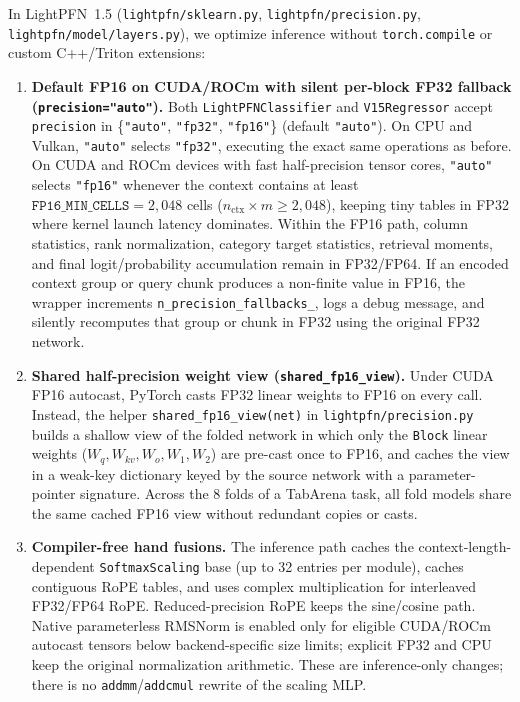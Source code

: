 \documentclass[11pt]{article}
\begin{document}
In LightPFN~1.5 (\texttt{lightpfn/sklearn.py}, \texttt{lightpfn/precision.py}, \texttt{lightpfn/model/layers.py}), we optimize inference without \texttt{torch.compile} or custom C++/Triton extensions: %
\begin{enumerate}
\item \textbf{Default FP16 on CUDA/ROCm with silent per-block FP32 fallback (\texttt{precision="auto"}).}
Both \texttt{LightPFNClassifier} and \texttt{V15Regressor} accept \texttt{precision} in \{\texttt{"auto"}, \texttt{"fp32"}, \texttt{"fp16"}\} (default \texttt{"auto"}).
On CPU and Vulkan, \texttt{"auto"} selects \texttt{"fp32"}, executing the exact same operations as before.
On CUDA and ROCm devices with fast half-precision tensor cores, \texttt{"auto"} selects \texttt{"fp16"} whenever the context contains at least $\texttt{FP16\_MIN\_CELLS} = 2{,}048$ cells ($n_{\text{ctx}} \times m \ge 2{,}048$), keeping tiny tables in FP32 where kernel launch latency dominates.
Within the FP16 path, column statistics, rank normalization, category target statistics, retrieval moments, and final logit/probability accumulation remain in FP32/FP64.
If an encoded context group or query chunk produces a non-finite value in FP16, the wrapper increments \texttt{n\_precision\_fallbacks\_}, logs a debug message, and silently recomputes that group or chunk in FP32 using the original FP32 network. %
\item \textbf{Shared half-precision weight view (\texttt{shared\_fp16\_view}).}
Under CUDA FP16 autocast, PyTorch casts FP32 linear weights to FP16 on every call.
Instead, the helper \texttt{shared\_fp16\_view(net)} in \texttt{lightpfn/precision.py} builds a shallow view of the folded network in which only the \texttt{Block} linear weights ($W_q, W_{kv}, W_o, W_1, W_2$) are pre-cast once to FP16, and caches the view in a weak-key dictionary keyed by the source network with a parameter-pointer signature.
Across the 8 folds of a TabArena task, all fold models share the same cached FP16 view without redundant copies or casts.
\item \textbf{Compiler-free hand fusions.}
The inference path caches the context-length-dependent \texttt{SoftmaxScaling} base (up to 32 entries per module), caches contiguous RoPE tables, and uses complex multiplication for interleaved FP32/FP64 RoPE. Reduced-precision RoPE keeps the sine/cosine path. Native parameterless RMSNorm is enabled only for eligible CUDA/ROCm autocast tensors below backend-specific size limits; explicit FP32 and CPU keep the original normalization arithmetic. These are inference-only changes; there is no \texttt{addmm}/\texttt{addcmul} rewrite of the scaling MLP. %
\end{enumerate}
\end{document}
